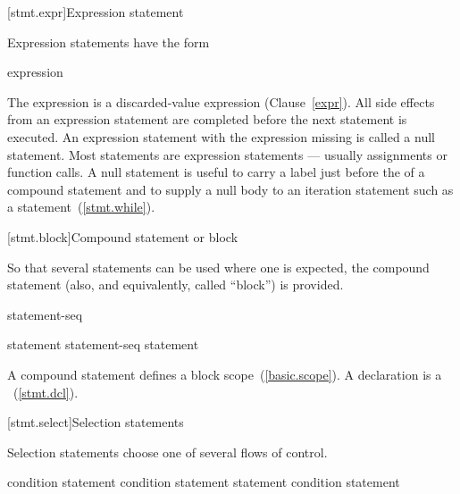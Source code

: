 [stmt.expr]{Expression statement}%

\pnum
Expression statements have the form

\begin{bnf}
\br
    expression\opt{} \terminal{;}
\end{bnf}

The expression is
a discarded-value expression (Clause~\ref{expr}).
All
%
side effects from an expression statement
are completed before the next statement is executed.
%
%
An expression statement with the expression missing is called a null
statement.
\enternote
Most statements are expression statements --- usually assignments or
function calls. A null statement is useful to carry a label just before
the \tcode{\}} of a compound statement and to supply a null body to an
iteration statement such as a 
statement~(\ref{stmt.while}).
\exitnote

[stmt.block]{Compound statement or block}%
%
%

\pnum
So that several statements can be used where one is expected, the
compound statement (also, and equivalently, called ``block'') is
provided.

\begin{bnf}
\br
    \terminal{\{} statement-seq\opt{} \terminal{\}}
\end{bnf}

\begin{bnf}
\br
    statement\br
    statement-seq statement
\end{bnf}

A compound statement defines a block scope~(\ref{basic.scope}).
\enternote
A declaration is a ~(\ref{stmt.dcl}).
\exitnote

[stmt.select]{Selection statements}%

\pnum
Selection statements choose one of several flows of control.

%
%
%
\begin{bnf}
\br
     condition \terminal{)} statement\br
     condition \terminal{)} statement  statement\br
     condition \terminal{)} statement
\end{bnf}

